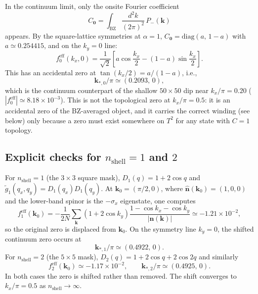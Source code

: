 \documentclass[aps,prb,onecolumn,nofootinbib,superscriptaddress]{revtex4-2}
\newcommand{\mbf}[1]{\mathbf{#1}}
\begin{document}
In the continuum limit, only the onsite Fourier coefficient
\begin{equation}
C_{\mbf{0}} = \int_{\mathrm{BZ}}\frac{d^2k}{(2\pi)^2}\,P_-(\mbf{k})
\end{equation}
appears. By the square-lattice symmetries at $\alpha=1$, $C_{\mbf{0}} = \mathrm{diag}(a,\,1-a)$ with $a\simeq 0.254415$, and on the $k_y=0$ line:
\begin{equation}
f_0^{\mathrm{eff}}(k_x,0) = \frac{1}{\sqrt{2}}\left[a\cos\frac{k_x}{2}-(1-a)\sin\frac{k_x}{2}\right].
\end{equation}
This has an accidental zero at $\tan(k_x/2)=a/(1-a)$, i.e.,
\begin{equation}
\mbf{k}_{*,0}/\pi \simeq (0.2093,\,0),
\end{equation}
which is the continuum counterpart of the shallow $50\times 50$ dip near $k_x/\pi=0.20$ ($|f_0^{\mathrm{eff}}|\simeq 8.18\times 10^{-3}$). This is not the topological zero at $k_x/\pi=0.5$: it is an accidental zero of the BZ-averaged object, and it carries the correct winding (see below) only because a zero must exist somewhere on $T^2$ for any state with $C=1$ topology.

\subsection{Explicit checks for \texorpdfstring{$n_{\mathrm{shell}}=1$ and $2$}{n-shell = 1 and 2}}

For $n_{\mathrm{shell}}=1$ (the $3\times 3$ square mask), $D_1(q)=1+2\cos q$ and $\widetilde{g}_1(q_x,q_y)=D_1(q_x)D_1(q_y)$. At $\mbf{k}_0=(\pi/2,0)$, where $\hat{\mbf{n}}(\mbf{k}_0)=(1,0,0)$ and the lower-band spinor is the $-\sigma_x$ eigenstate, one computes
\begin{equation}
f_1^{\mathrm{eff}}(\mbf{k}_0) = -\frac{1}{2N}\sum_{\mbf{k}}(1+2\cos k_y)\frac{1-\cos k_x-\cos k_y}{|\mbf{n}(\mbf{k})|} \simeq -1.21\times 10^{-2},
\end{equation}
so the original zero is displaced from $\mbf{k}_0$. On the symmetry line $k_y=0$, the shifted continuum zero occurs at
\begin{equation}
\mbf{k}_{*,1}/\pi \simeq (0.4922,\,0).
\end{equation}
For $n_{\mathrm{shell}}=2$ (the $5\times 5$ mask), $D_2(q)=1+2\cos q+2\cos 2q$ and similarly
\begin{equation}
f_2^{\mathrm{eff}}(\mbf{k}_0) \simeq -1.17\times 10^{-2}, \qquad \mbf{k}_{*,2}/\pi \simeq (0.4925,\,0).
\end{equation}
In both cases the zero is shifted rather than removed. The shift converges to $k_x/\pi=0.5$ as $n_{\mathrm{shell}}\to\infty$.
\end{document}
